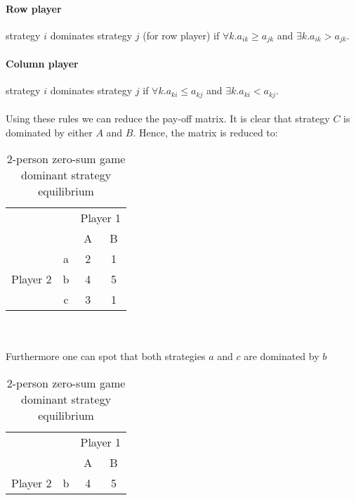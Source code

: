 \documentclass[10pt, a4paper]{report}
\begin{document}
\paragraph{Row player} strategy $i$ dominates strategy $j$ (for row player) if $\forall k. a_{ik} \ge a_{jk}$ and $\exists k.a_{ik} > a_{jk}$.
\paragraph{Column player} strategy $i$ dominates strategy $j$ if $\forall k. a_{ki} \le a_{kj}$ and $\exists k.a_{ki} < a_{kj}$.
\\\\
Using these rules we can reduce the pay-off matrix. It is clear that strategy $C$ is dominated by either $A$ and $B$. Hence, the matrix is reduced to:
\begin{table}[ht!]
	\hspace{-4em}
	\centering
	\begin{tabular}{cccc|}
		& & \multicolumn{2}{c}{Player 1}                            \\ \cline{3-4}
		& & A & \multicolumn{1}{c}{B}                               \\ \cline{3-4}
		\multirow{3}{*}{Player 2} & \multicolumn{1}{|c|}{a} & 2 & 1 \\
		& \multicolumn{1}{|c|}{b} & 4 & 5                           \\
		& \multicolumn{1}{|c|}{c} & 3 & 1                           \\ \cline{3-4}
	\end{tabular}
	\caption{2-person zero-sum game\\ dominant strategy equilibrium}
\end{table}
\\\\
Furthermore one can spot that both strategies $a$ and $c$ are dominated by $b$
\begin{table}[ht!]
	\hspace{-4em}
	\centering
	\begin{tabular}{cccc|}
		& & \multicolumn{2}{c}{Player 1}           \\ \cline{3-4}
		& & A & \multicolumn{1}{c}{B}              \\ \cline{3-4}
		Player 2 & \multicolumn{1}{|c|}{b} & 4 & 5 \\ \cline{3-4}
	\end{tabular}
	\caption{2-person zero-sum game\\ dominant strategy equilibrium}
\end{table}
\end{document}
